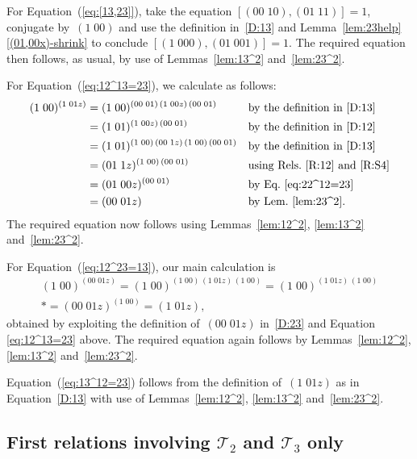 \documentclass[a4paper,11pt]{article}
\numberwithin{equation}{section}
\newcommand{\eqstate}[1]{Equation~(\ref{#1})}
\newcommand{\swap}[2]{(#1\;#2)}
\newcommand{\Sw}[1]{\mathcal{T}_{#1}}
\begin{document}
For \eqstate{eq:[13,23]}, take the equation $[ \swap{00}{10} ,
  \swap{01}{11} ] = 1$, conjugate by~$\swap{1}{00}$ and use the
definition in~\eqref{D:13} and
Lemma~\ref{lem:23help}\ref{(01,00x)-shrink} to conclude $[
  \swap{1}{000} , \swap{01}{001} ] = 1$.  The required equation then
follows, as usual, by use of Lemmas~\ref{lem:13^2}
and~\ref{lem:23^2}.

For \eqstate{eq:12^13=23}, we calculate as follows:
\begin{align*}
  \swap{1}{00}^{\swap{1}{01z}}
  &= \swap{1}{00}^{\swap{00}{01} \, \swap{1}{00z} \, \swap{00}{01}}
  &&\text{by the definition in~\eqref{D:13}} \\
  &= \swap{1}{01}^{\swap{1}{00z} \, \swap{00}{01}}
  &&\text{by the definition in~\eqref{D:12}} \\
  &= \swap{1}{01}^{\swap{1}{00} \, \swap{00}{1z} \, \swap{1}{00} \,
    \swap{00}{01}}
  &&\text{by the definition in~\eqref{D:13}} \\
  &= \swap{01}{1z}^{\swap{1}{00} \, \swap{00}{01}}
  &&\text{using Rels.\ \ref{R:12} and~\ref{R:S4}} \\
  &= \swap{01}{00z}^{\swap{00}{01}}
  &&\text{by Eq.~\eqref{eq:22^12=23}} \\
  &= \swap{00}{01z}
  &&\text{by Lem.~\ref{lem:23^2}.}
\end{align*}
The required equation now follows using Lemmas~\ref{lem:12^2},
\ref{lem:13^2} and~\ref{lem:23^2}.

For \eqstate{eq:12^23=13}, our main calculation is
\begin{multline*}
  \swap{1}{00}^{\swap{00}{01z}} =
  \swap{1}{00}^{\swap{1}{00} \, \swap{1}{01z} \, \swap{1}{00}} =
  \swap{1}{00}^{\swap{1}{01z} \, \swap{1}{00}} \\*
  = \swap{00}{01z}^{\swap{1}{00}} =
  \swap{1}{01z},
\end{multline*}
obtained by exploiting the definition of~$\swap{00}{01z}$
in~\eqref{D:23} and Equation \eqref{eq:12^13=23} above.  The required
equation again follows by Lemmas~\ref{lem:12^2}, \ref{lem:13^2}
and~\ref{lem:23^2}.

\eqstate{eq:13^12=23} follows from the definition of~$\swap{1}{01z}$
as in Equation~\eqref{D:13} with use of Lemmas~\ref{lem:12^2},
\ref{lem:13^2} and~\ref{lem:23^2}.

\subsection{\boldmath First relations involving $\Sw{2}$ and $\Sw{3}$
  only}
\end{document}
